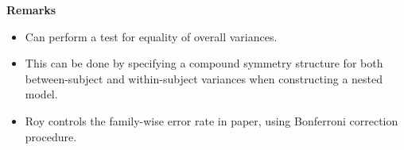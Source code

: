 \documentclass[compress]{beamer}        %
\makeatletter
\newcommand{\tcb}{\textcolor{beamer@blendedblue}}
\makeatother
\begin{document}
		\begin{frame}[fragile]{\bf \tcb{Remarks}}
			\large 
			\begin{itemize}
				\item Can perform a test for equality of overall variances.\\
				\vspace{0.25cm}\item This can be done by specifying a compound symmetry structure for both between-subject and within-subject variances when constructing a nested model.\\
				\vspace{0.25cm}\item Roy controls the family-wise error rate in paper, using Bonferroni correction procedure.
			\end{itemize}
		\end{frame}
\end{document}
